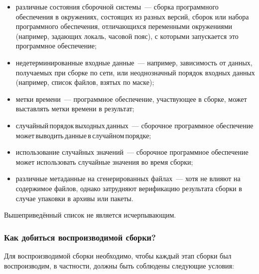 \documentclass[10pt, a5paper]{article}
\begin{document}
\begin{itemize}
  \item различные состояния сборочной системы~--- сборка программного обеспечения в окружениях, состоящих из разных версий, сборок или набора программного обеспечения, отличающихся переменными окружениями (например, задающих локаль, часовой пояс), с которыми запускается это программное обеспечение;
  \item недетерминированные входные данные~--- например, зависимость от данных, получаемых при сборке по сети, или неоднозначный порядок входных данных (например, список файлов, взятых по маске);
  \item метки времени~--- программное обеспечение, участвующее в сборке, может выставлять метки времени в результат;
  \item случайный\,порядок\,выходных\,данных~--- сборочное программное обеспечение\,может\,выводить\,данные\,в\,случайном\,порядке;
  \item использование случайных значений~--- сборочное программное обеспечение может использовать случайные значения во время сборки;
  \item различные метаданные на сгенерированных файлах~--- хотя не влияют на содержимое файлов, однако затрудняют верификацию результата сборки в случае упаковки в архивы или пакеты.
\end{itemize}

Вышеприведённый список не является исчерпывающим.

\subsubsection*{Как добиться воспроизводимой сборки?}

Для воспроизводимой сборки необходимо, чтобы каждый этап сборки был воспроизводим, в частности, должны быть соблюдены следующие условия:
\end{document}
